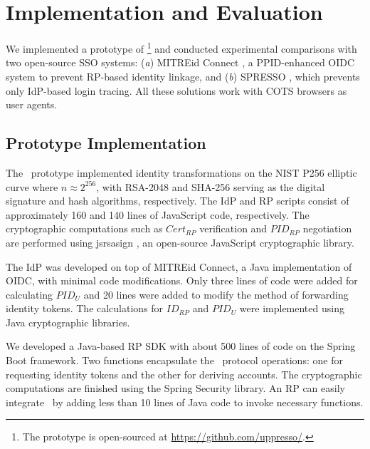 \section{Implementation and Evaluation}
\label{sec:implementation}

We implemented a prototype of \usso\footnote{The prototype is open-sourced at \url{https://github.com/uppresso/}.} and conducted experimental comparisons with two open-source SSO systems:
 (\emph{a}) MITREid Connect \cite{MITREid}, a PPID-enhanced OIDC system \cite{NIST2017draft} to prevent RP-based identity linkage,
 and (\emph{b}) SPRESSO \cite{SPRESSO}, which prevents only IdP-based login tracing.
All these solutions work with COTS browsers as user agents.

\subsection{Prototype Implementation}
\label{subsec:proto-imple}

The \usso\ prototype implemented identity transformations on the NIST P256 elliptic curve where $n \approx 2^{256}$, with RSA-2048 and SHA-256 serving as the digital signature and hash algorithms, respectively. The IdP and RP scripts consist of approximately 160 and 140 lines of JavaScript code, respectively.  %
The cryptographic computations such as $Cert_{RP}$ verification and $PID_{RP}$ negotiation are performed using jsrsasign \cite{jsrsasign}, an open-source JavaScript cryptographic library.

The IdP was developed on top of MITREid Connect\cite{MITREid}, a Java implementation of OIDC, %
with minimal code modifications. Only three lines of code were added for calculating $PID_U$ and 20 lines were added to modify the method of forwarding identity tokens.
The calculations for $ID_{RP}$ and $PID_U$ were implemented using Java cryptographic libraries.

We developed a Java-based RP SDK with about 500 lines of code on the Spring Boot framework.
Two functions encapsulate the \usso\ protocol operations: one for requesting identity tokens and the other for deriving accounts. The cryptographic computations are finished using the Spring Security library.
An RP can easily integrate \usso\ by  adding less than 10 lines of Java code to invoke necessary functions.
